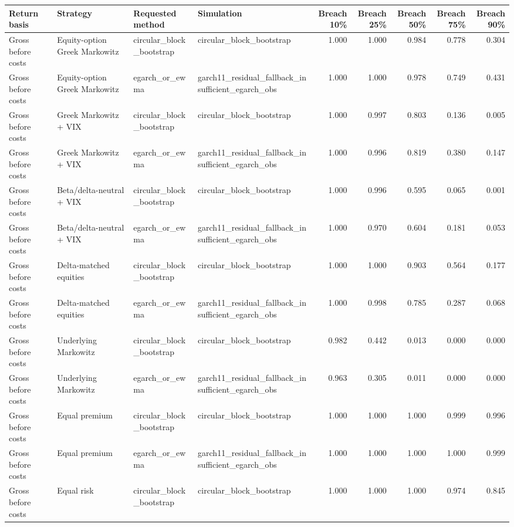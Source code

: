 \begin{tabular}{llllrrrrr}
\toprule
Return basis & Strategy & Requested method & Simulation & Breach 10\% & Breach 25\% & Breach 50\% & Breach 75\% & Breach 90\% \\
\midrule
Gross before costs & Equity-option Greek Markowitz & circular\_block\_bootstrap & circular\_block\_bootstrap & 1.000 & 1.000 & 0.984 & 0.778 & 0.304 \\
Gross before costs & Equity-option Greek Markowitz & egarch\_or\_ewma & garch11\_residual\_fallback\_insufficient\_egarch\_obs & 1.000 & 1.000 & 0.978 & 0.749 & 0.431 \\
Gross before costs & Greek Markowitz + VIX & circular\_block\_bootstrap & circular\_block\_bootstrap & 1.000 & 0.997 & 0.803 & 0.136 & 0.005 \\
Gross before costs & Greek Markowitz + VIX & egarch\_or\_ewma & garch11\_residual\_fallback\_insufficient\_egarch\_obs & 1.000 & 0.996 & 0.819 & 0.380 & 0.147 \\
Gross before costs & Beta/delta-neutral + VIX & circular\_block\_bootstrap & circular\_block\_bootstrap & 1.000 & 0.996 & 0.595 & 0.065 & 0.001 \\
Gross before costs & Beta/delta-neutral + VIX & egarch\_or\_ewma & garch11\_residual\_fallback\_insufficient\_egarch\_obs & 1.000 & 0.970 & 0.604 & 0.181 & 0.053 \\
Gross before costs & Delta-matched equities & circular\_block\_bootstrap & circular\_block\_bootstrap & 1.000 & 1.000 & 0.903 & 0.564 & 0.177 \\
Gross before costs & Delta-matched equities & egarch\_or\_ewma & garch11\_residual\_fallback\_insufficient\_egarch\_obs & 1.000 & 0.998 & 0.785 & 0.287 & 0.068 \\
Gross before costs & Underlying Markowitz & circular\_block\_bootstrap & circular\_block\_bootstrap & 0.982 & 0.442 & 0.013 & 0.000 & 0.000 \\
Gross before costs & Underlying Markowitz & egarch\_or\_ewma & garch11\_residual\_fallback\_insufficient\_egarch\_obs & 0.963 & 0.305 & 0.011 & 0.000 & 0.000 \\
Gross before costs & Equal premium & circular\_block\_bootstrap & circular\_block\_bootstrap & 1.000 & 1.000 & 1.000 & 0.999 & 0.996 \\
Gross before costs & Equal premium & egarch\_or\_ewma & garch11\_residual\_fallback\_insufficient\_egarch\_obs & 1.000 & 1.000 & 1.000 & 1.000 & 0.999 \\
Gross before costs & Equal risk & circular\_block\_bootstrap & circular\_block\_bootstrap & 1.000 & 1.000 & 1.000 & 0.974 & 0.845 \\

\end{tabular}

